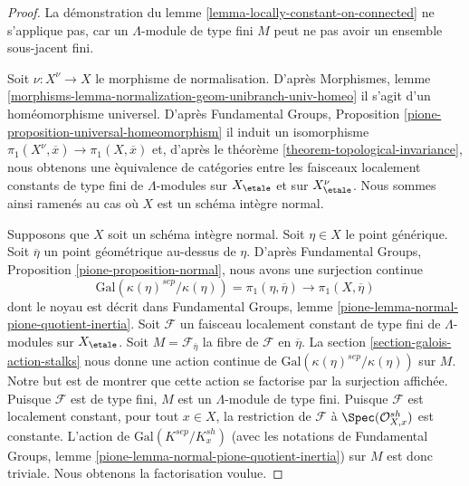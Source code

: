 \begin{proof}
La d\'emonstration du lemme \ref{lemma-locally-constant-on-connected}
ne s'applique pas, car un $\Lambda$-module de type fini $M$ peut ne pas avoir
un ensemble sous-jacent fini.

\medskip\noindent
Soit $\nu : X^\nu \to X$ le morphisme de normalisation. D'apr\`es Morphismes, lemme
\ref{morphisms-lemma-normalization-geom-unibranch-univ-homeo}
il s'agit d'un hom\'eomorphisme universel. D'apr\`es
Fundamental Groups, Proposition \ref{pione-proposition-universal-homeomorphism}
il induit un isomorphisme
$\pi_1(X^\nu, \overline{x}) \to \pi_1(X, \overline{x})$
et, d'apr\`es le th\'eor\`eme \ref{theorem-topological-invariance}, nous obtenons
une \`equivalence de cat\'egories entre les faisceaux localement constants de type fini
de $\Lambda$-modules sur $X_\etale$ et sur $X^\nu_\etale$.
Nous sommes ainsi ramen\'es au cas o\`u $X$ est un sch\'ema int\`egre normal.

\medskip\noindent
Supposons que $X$ soit un sch\'ema int\`egre normal. Soit $\eta \in X$ le point g\'en\'erique.
Soit $\overline{\eta}$ un point g\'eom\'etrique au-dessus de $\eta$.
D'apr\`es Fundamental Groups, Proposition \ref{pione-proposition-normal},
nous avons une surjection continue
$$
\text{Gal}(\kappa(\eta)^{sep}/\kappa(\eta)) = \pi_1(\eta, \overline{\eta})
\longrightarrow
\pi_1(X, \overline{\eta})
$$
dont le noyau est d\'ecrit dans Fundamental Groups, lemme
\ref{pione-lemma-normal-pione-quotient-inertia}.
Soit $\mathcal{F}$ un faisceau localement constant de type fini de $\Lambda$-modules
sur $X_\etale$. Soit $M = \mathcal{F}_{\overline{\eta}}$
la fibre de $\mathcal{F}$ en $\overline{\eta}$.
La section \ref{section-galois-action-stalks} nous donne une action continue de
$\text{Gal}(\kappa(\eta)^{sep}/\kappa(\eta))$ sur $M$.
Notre but est de montrer que cette action se factorise par la
surjection affich\'ee.
Puisque $\mathcal{F}$ est de type fini, $M$ est un $\Lambda$-module de type fini.
Puisque $\mathcal{F}$ est localement constant, pour tout $x \in X$,
la restriction de $\mathcal{F}$ \`a $\Spec(\mathcal{O}_{X, x}^{sh})$
est constante. L'action de $\text{Gal}(K^{sep}/K_x^{sh})$
(avec les notations de Fundamental Groups, lemme
\ref{pione-lemma-normal-pione-quotient-inertia})
sur $M$ est donc triviale. Nous obtenons la factorisation voulue.


\end{proof}
